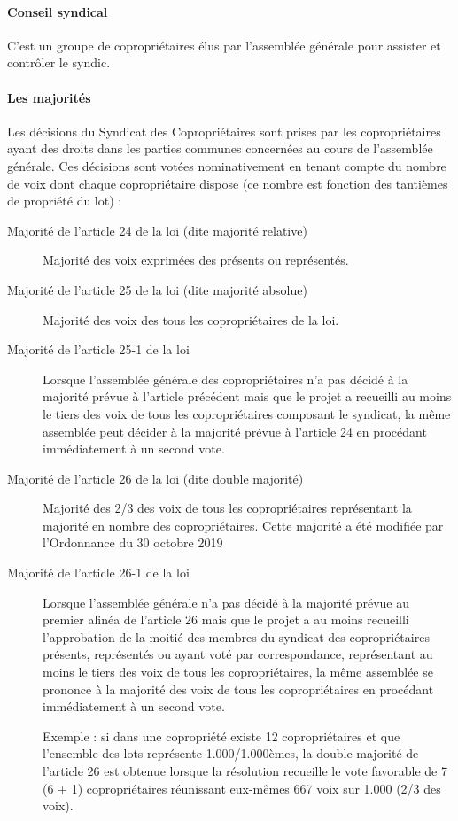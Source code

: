 	\paragraph*{Conseil syndical}
	C'est un groupe de copropriétaires élus par l'assemblée générale pour assister et contrôler le syndic.
	
	\paragraph*{Les majorités}
	Les décisions du Syndicat des Copropriétaires sont prises par les copropriétaires ayant des droits dans les parties communes concernées au cours de l’assemblée générale.
	Ces décisions sont votées nominativement en tenant compte du nombre de voix dont chaque copropriétaire dispose (ce nombre est fonction des tantièmes de propriété du lot) :
	\begin{description}
		\item[Majorité de l’article 24 de la loi (dite majorité relative)] Majorité des voix exprimées des présents ou représentés.
		\item[Majorité de l’article 25 de la loi (dite majorité absolue)] Majorité des voix des tous les copropriétaires de la loi.
		\item[Majorité de l’article 25-1 de la loi] Lorsque l'assemblée générale des copropriétaires n'a pas décidé à la majorité prévue à l'article précédent mais que le projet a recueilli au moins le tiers des voix de tous les copropriétaires composant le syndicat, la même assemblée peut décider à la majorité prévue à l'article 24 en procédant immédiatement à un second vote.
		\item[Majorité de l’article 26 de la loi (dite double majorité)] Majorité des 2/3 des voix de tous les copropriétaires représentant la majorité en nombre des copropriétaires. Cette majorité a été modifiée par l’Ordonnance du 30 octobre 2019
		\item[Majorité de l’article 26-1 de la loi] Lorsque l’assemblée générale n’a pas décidé à la majorité prévue au premier alinéa de l’article 26 mais que le projet a au moins recueilli l’approbation de la moitié des membres du syndicat des copropriétaires présents, représentés ou ayant voté par correspondance, représentant au moins le tiers des voix de tous les copropriétaires, la même assemblée se prononce à la majorité des voix de tous les copropriétaires en procédant immédiatement à un second vote.
		
		Exemple : si dans une copropriété existe 12 copropriétaires et que l’ensemble des lots représente 1.000/1.000èmes, la double majorité de l’article 26 est obtenue lorsque la résolution recueille le vote favorable de 7 (6 + 1) copropriétaires réunissant eux-mêmes 667 voix sur 1.000 (2/3 des voix).
	\end{description}


